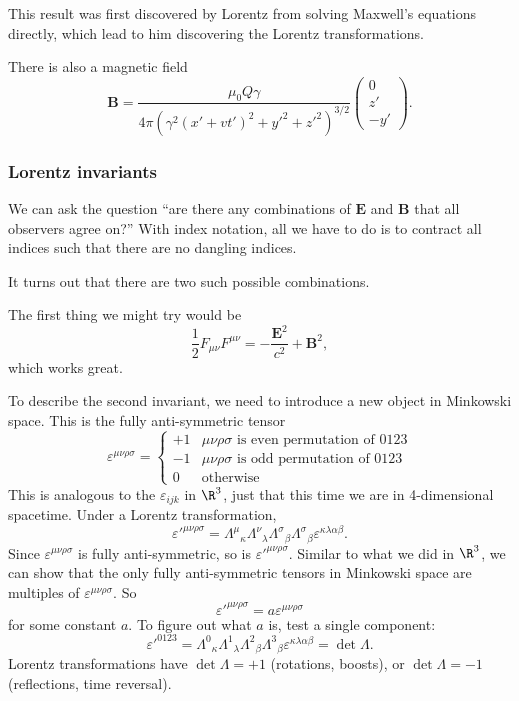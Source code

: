 \documentclass[a4paper]{article}
\begin{document}
\begin{eg}
  This result was first discovered by Lorentz from solving Maxwell's equations directly, which lead to him discovering the Lorentz transformations.

  There is also a magnetic field
  \[
    \mathbf{B} = \frac{\mu_0 Q\gamma}{4\pi(\gamma^2(x' + vt')^2 + y'^2 + z'^2)^{3/2}}
    \begin{pmatrix}
      0\\z'\\-y'
    \end{pmatrix}.
  \]
\end{eg}

\subsubsection*{Lorentz invariants}
We can ask the question ``are there any combinations of $\mathbf{E}$ and $\mathbf{B}$ that all observers agree on?'' With index notation, all we have to do is to contract all indices such that there are no dangling indices.

It turns out that there are two such possible combinations.

The first thing we might try would be
\[
  \frac{1}{2}F_{\mu\nu}F^{\mu\nu} = -\frac{\mathbf{E}^2}{c^2} + \mathbf{B}^2,
\]
which works great.

To describe the second invariant, we need to introduce a new object in Minkowski space. This is the fully anti-symmetric tensor
\[
  \varepsilon^{\mu\nu\rho\sigma} =
  \begin{cases}
    +1 & \mu\nu\rho\sigma\text{ is even permutation of 0123}\\
    -1 & \mu\nu\rho\sigma\text{ is odd permutation of 0123}\\
    0 & \text{otherwise}
  \end{cases}
\]
This is analogous to the $\varepsilon_{ijk}$ in $\R^3$, just that this time we are in 4-dimensional spacetime. Under a Lorentz transformation,
\[
  \varepsilon'^{\mu\nu\rho\sigma} = \Lambda^\mu\!_\kappa\Lambda^\nu\!_\lambda \Lambda^\sigma\!_\beta \Lambda^\sigma\!_\beta \varepsilon^{\kappa\lambda\alpha\beta}.
\]
Since $\varepsilon^{\mu\nu\rho\sigma}$ is fully anti-symmetric, so is $\varepsilon'^{\mu\nu\rho\sigma}$. Similar to what we did in $\R^3$, we can show that the only fully anti-symmetric tensors in Minkowski space are multiples of $\varepsilon^{\mu\nu\rho\sigma}$. So
\[
  \varepsilon'^{\mu\nu\rho\sigma} = a \varepsilon^{\mu\nu\rho\sigma}
\]
for some constant $a$. To figure out what $a$ is, test a single component:
\[
  \varepsilon'^{0123} = \Lambda^0\!_\kappa\Lambda^1\!_\lambda \Lambda^2\!_\beta \Lambda^3\!_\beta \varepsilon^{\kappa\lambda\alpha\beta} = \det \Lambda.
\]
Lorentz transformations have $\det \Lambda = +1$ (rotations, boosts), or $\det \Lambda = -1$ (reflections, time reversal).
\end{document}
